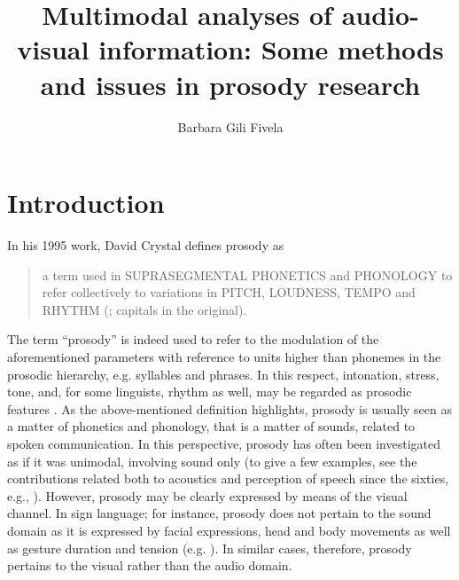 \documentclass[output=paper]{langsci/langscibook}
\author{Barbara Gili Fivela\affiliation{University of Salento}}
\title{Multimodal analyses of audio-visual information: Some methods and issues in prosody research}
\begin{document}
 
\label{chap:gil}\label{ch:3}


\section{Introduction} \label{sec:gil:1}

In his 1995 work, David Crystal defines prosody as 

\begin{quote}
a term used in SUPRASEGMENTAL PHONETICS and PHONOLOGY to refer collectively to variations in PITCH, LOUDNESS, TEMPO and RHYTHM (\citealt{Crystal1995}; capitals in the original). 
\end{quote}

The term ``prosody'' is indeed used to refer to the modulation of the aforementioned parameters with reference to units higher than phonemes in the prosodic hierarchy, e.g. syllables and phrases. In this respect, intonation, stress, tone, and, for some linguists, rhythm as well, may be regarded as prosodic features \citep{Beccaria1994}. As the above-mentioned definition highlights, prosody is usually seen as a matter of phonetics and phonology, that is a matter of sounds, related to spoken communication. In this perspective, prosody has often been investigated as if it was unimodal, involving sound only (to give a few examples, see the contributions related both to acoustics and perception of speech since the sixties, e.g., \citealt{Lehiste1975,Lehiste1977}). However, prosody may be clearly expressed by means of the visual channel. In sign language; for instance, prosody does not pertain to the sound domain as it is expressed by facial expressions, head and body movements as well as gesture duration and tension (e.g. \citealt{Nespor1999,Wilbur2000,Sandler2005}). In similar cases, therefore, prosody pertains to the visual rather than the audio domain.
\end{document}
